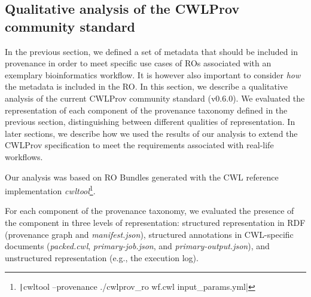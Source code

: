 \subsection{Qualitative analysis of the CWLProv community standard}

\label{sec:cwlprov_evaluation}




In the previous section, we defined a set of metadata that should be included in provenance in order to meet specific use cases of ROs associated with an exemplary bioinformatics workflow. It is however also important to consider \emph{how} the metadata is included in the RO. In this section, we describe a qualitative analysis of the current CWLProv community standard (v0.6.0). %
We evaluated the representation of each component of the provenance taxonomy defined in the previous section, distinguishing between different qualities of representation. In later sections, we describe how we used the results of our analysis to extend the CWLProv specification to meet the requirements associated with real-life workflows.


Our analysis was based on RO Bundles generated with the CWL reference implementation \emph{cwltool}\footnote{
\texttt|cwltool --provenance ./cwlprov_ro wf.cwl input_params.yml|
}.

For each component of the provenance taxonomy, we evaluated the presence of the component in three levels of representation: structured representation in RDF (provenance graph and \emph{manifest.json}), structured annotations in CWL-specific documents (\emph{packed.cwl}, \emph{primary-job.json}, and \emph{primary-output.json}), and unstructured representation (e.g., the execution log). 

